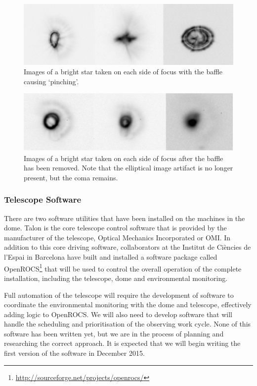 \documentclass[a4paper,fleqn,usenatbib]{mnras}
\begin{document}
\begin{figure}
	\includegraphics[width=\columnwidth]{images/ellipse.png}
    \caption{Images of a bright star taken on each side of focus with the baffle causing `pinching'.}
    \label{fig:ellipse}
\end{figure}

\begin{figure}
	\includegraphics[width=\columnwidth]{images/ellipse-corrected.png}
    \caption{Images of a bright star taken on each side of focus after the baffle has been removed. Note that the elliptical image artifact is no longer present, but the coma remains.}
    \label{fig:ellipse-corrected}
\end{figure}


\subsubsection{Telescope Software}
There are two software utilities that have been installed on the machines in the dome. Talon is the core telescope control software that is provided by the manufacturer of the telescope, Optical Mechanics Incorporated or OMI. In addition to this core driving software, collaborators at the Institut de Ci\`{e}ncies de l'Espai in Barcelona have built and installed a software package called OpenROCS\footnote{\url{http://sourceforge.net/projects/openrocs/}} that will be used to control the overall operation of the complete installation, including the telescope, dome and environmental monitoring. 

Full automation of the telescope will require the development of software to coordinate the environmental monitoring with the dome and telescope, effectively adding logic to OpenROCS. We will also need to develop software that will handle the scheduling and prioritisation of the observing work cycle. None of this software has been written yet, but we are in the process of planning and researching the correct approach. It is expected that we will begin writing the first version of the software in December 2015. 
\end{document}
